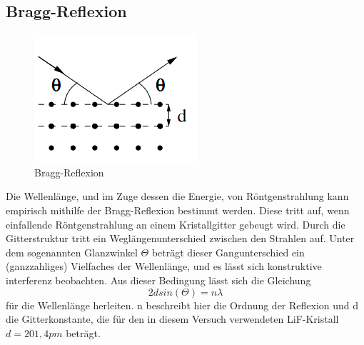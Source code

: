 \subsection{Bragg-Reflexion}
\begin{figure}[h]
    \centering
    \includegraphics{Bragg-Reflexion}
    \caption{Bragg-Reflexion}
\end{figure}
Die Wellenlänge, und im Zuge dessen die Energie, von Röntgenstrahlung kann empirisch mithilfe der Bragg-Reflexion bestimmt werden. Diese tritt auf, wenn einfallende Röntgenstrahlung an einem Kristallgitter gebeugt wird. Durch die Gitterstruktur tritt ein Weglängenunterschied zwischen den Strahlen auf. Unter dem sogenannten Glanzwinkel $\Theta$ beträgt dieser Gangunterschied ein (ganzzahliges) Vielfaches der Wellenlänge, und es lässt sich konstruktive interferenz beobachten. Aus dieser Bedingung lässt sich die Gleichung
\begin{equation}
2dsin(\Theta)=n\lambda
\end{equation}
für die Wellenlänge herleiten. n beschreibt hier die Ordnung der Reflexion und d die Gitterkonstante, die für den in diesem Versuch verwendeten LiF-Kristall $d=201,4 pm$ beträgt.
